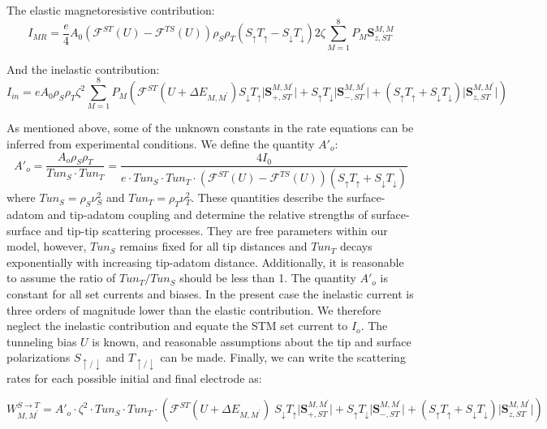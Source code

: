 \documentclass[reprint,amsmath,amssymb,aps,nofootinbib,onecolumn]{revtex4-2}
\begin{document}
The elastic magnetoresistive contribution:
\begin{equation}
I_{MR}=\dfrac{e}{4} A_0 \left( \mathcal{F}^{ST}(U)-\mathcal{F}^{TS}(U) \right)\rho_S\rho_T \left( S_{\uparrow}T_{\uparrow} - S_{\downarrow}T_{\downarrow} \right) 2\zeta \sum^{8}_{M=1}P_M \textbf{S}_{z,ST}^{M,M}
\label{eq:I_MR}
\end{equation}

And the inelastic contribution:
\begin{equation}
I_{in}=e A_0 \rho_S\rho_T \zeta^{2} \sum_{M=1}^{8}  P_M \left( \mathcal{F}^{ST}(U+\Delta E_{M,M^{\prime}})
S_{\downarrow}T_{\uparrow} \lvert \textbf{S}_{+,ST}^{M,M^{\prime}}\rvert +  S_{\uparrow}T_{\downarrow} \lvert {\textbf{S}_{-,ST}^{M,M^{\prime}}}\rvert +\left( S_{\uparrow}T_{\uparrow}+S_{\downarrow}T_{\downarrow}  \right) \lvert \textbf{S}_{z,ST}^{M,M^{\prime}}\rvert \right)
\label{eq:I_in}
\end{equation}

As mentioned above, some of the unknown constants in the rate equations can be inferred from experimental conditions. We define the quantity  $A'_{o}$:
\begin{equation}
A'_{o}= \dfrac{A_{o} \rho_S\rho_T}{Tun_S\cdot Tun_T} = \dfrac{4I_0}{e\cdot Tun_S\cdot Tun_T\cdot \left( \mathcal{F}^{ST}(U)-\mathcal{F}^{TS}(U) \right)\left( S_{\uparrow}T_{\uparrow} + S_{\downarrow}T_{\downarrow} \right)}
\label{eq:el_rate}
\end{equation} 
where $Tun_{S} = \rho_{S} \nu^{2}_{S}$ and $Tun_{T} = \rho_{T} \nu^{2}_{T}$. These quantities describe the surface-adatom and tip-adatom coupling and determine the relative strengths of surface-surface and tip-tip scattering processes. They are free parameters within our model, however, $Tun_{S}$ remains fixed for all tip distances and $Tun_{T}$ decays exponentially with increasing tip-adatom distance. Additionally, it is reasonable to assume the ratio of $Tun_{T} / Tun_{S}$ should be less than 1. The quantity $A'_{o}$ is constant for all set currents and biases. In the present case the inelastic current is three orders of magnitude lower than the elastic contribution. We therefore neglect the inelastic contribution and equate the STM set current to $I_{o}$. The tunneling bias $U$ is known, and reasonable assumptions about the tip and surface polarizations $S_{\uparrow/\downarrow}$ and $T_{\uparrow/\downarrow}$ can be made. Finally, we can write the scattering rates for each possible initial and final electrode as:

\begin{equation}
W_{M,M^{\prime}}^{S \rightarrow T}=A'_{o}\cdot\zeta^2\cdot Tun_S\cdot Tun_T\cdot \left( \mathcal{F}^{ST}(U+\Delta E_{M,M^{\prime}})\;S_{\downarrow}T_{\uparrow} \lvert \textbf{S}_{+,ST}^{M,M^{\prime}}\rvert +  S_{\uparrow}T_{\downarrow} \lvert {\textbf{S}_{-,ST}^{M,M^{\prime}}}\rvert +\left( S_{\uparrow}T_{\uparrow}+S_{\downarrow}T_{\downarrow}  \right) \lvert \textbf{S}_{z,ST}^{M,M^{\prime}}\rvert \right)
\end{equation}
\end{document}
